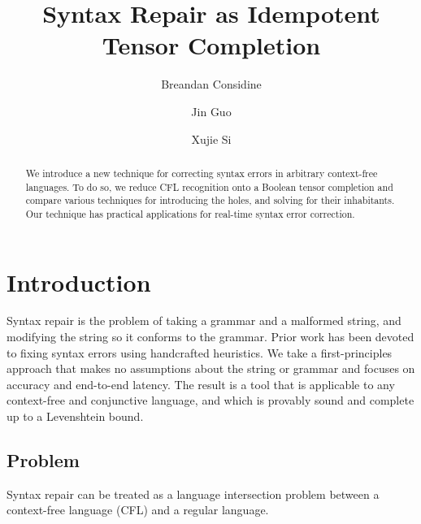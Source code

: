 \documentclass[runningheads]{llncs}
\begin{document}
%
\title{Syntax Repair as Idempotent Tensor Completion}
%
%
\author{Breandan Considine \and
Jin Guo\and
Xujie Si}
%
%
%
\maketitle              %
%
\begin{abstract}

We introduce a new technique for correcting syntax errors in arbitrary context-free languages. To do so, we reduce CFL recognition onto a Boolean tensor completion and compare various techniques for introducing the holes, and solving for their inhabitants. Our technique has practical applications for real-time syntax error correction.

\end{abstract}

\section{Introduction}

Syntax repair is the problem of taking a grammar and a malformed string, and modifying the string so it conforms to the grammar. Prior work has been devoted to fixing syntax errors using handcrafted heuristics. We take a first-principles approach that makes no assumptions about the string or grammar and focuses on accuracy and end-to-end latency. The result is a tool that is applicable to any context-free and conjunctive language, and which is provably sound and complete up to a Levenshtein bound.

\subsection{Problem}

Syntax repair can be treated as a language intersection problem between a context-free language (CFL) and a regular language.
\end{document}
